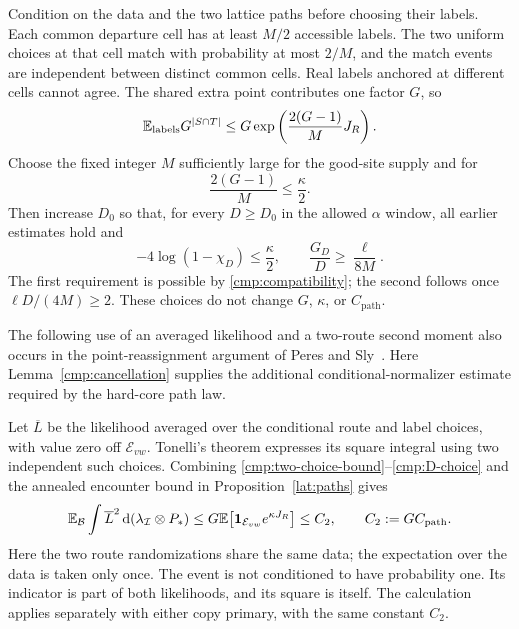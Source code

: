 Condition on the data and the two lattice paths before choosing their labels.
Each common departure cell has at least $M/2$ accessible labels. The two
uniform choices at that cell match with probability at most $2/M$, and the
match events are independent between distinct common cells. Real labels
anchored at different cells cannot agree. The shared extra point contributes
one factor $G$, so
\begin{equation}\label{cmp:label-average}
 \mathbb E_{\mathrm{labels}}G^{|S\cap T|}
 \le G\exp\left(\frac{2(G-1)}M J_R\right).
\end{equation}
Choose the fixed integer $M$ sufficiently large for the good-site supply
and for
\begin{equation}\label{cmp:M-choice}
 \frac{2(G-1)}M\le\frac\kappa2.
\end{equation}
Then increase $D_0$ so that, for every $D\ge D_0$ in the allowed $\alpha$
window, all earlier estimates hold and
\begin{equation}\label{cmp:D-choice}
 -4\log(1-\chi_D)\le\frac\kappa2,
 \qquad
 \frac{G_D}{D}\ge\frac\ell{8M}.
\end{equation}
The first requirement is possible by \eqref{cmp:compatibility}; the second
follows once $\ell D/(4M)\ge2$. These choices do not change $G$, $\kappa$,
or $C_{\mathrm{path}}$.

The following use of an averaged likelihood and a two-route second moment
also occurs in the point-reassignment argument of
Peres and Sly~\cite[Proposition~2.1]{PeresSly2014}. Here
Lemma~\ref{cmp:cancellation} supplies the additional conditional-normalizer
estimate required by the hard-core path law.

Let $\overline L$ be the likelihood averaged over the conditional route and
label choices, with value zero off $\mathcal E_{vw}$. Tonelli's theorem
expresses its square integral using two independent such choices. Combining
\eqref{cmp:two-choice-bound}--\eqref{cmp:D-choice} and the annealed encounter
bound in Proposition~\ref{lat:paths} gives
\begin{equation}\label{cmp:latent-second-moment}
 \mathbb E_{\mathcal B}\int\overline L^{2}
           \,\mathrm d(\lambda_{\mathcal I}\otimes P_*)
 \le G\mathbb E\bigl[\mathbf 1_{\mathcal E_{vw}}e^{\kappa J_R}\bigr]
 \le C_2,
 \qquad C_2:=G C_{\mathrm{path}}.
\end{equation}
Here the two route randomizations share the same data; the expectation over
the data is taken only once. The event is not conditioned to have probability
one. Its indicator is part of both likelihoods, and its square is itself.
The calculation applies separately with either copy primary, with the same
constant $C_2$.

